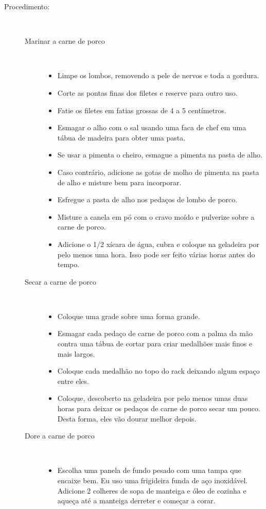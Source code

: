\documentclass [11pt, papel de carta] {article}
\begin{document}
\begin {description}
\item [Procedimento:] \ \\
        \begin {description}
        \item [Marinar a carne de porco] \ \\
                \begin {itemize}
\item Limpe os lombos, removendo a pele de nervos e toda a gordura.
\item Corte as pontas finas dos filetes e reserve para outro uso.
\item Fatie os filetes em fatias grossas de 4 a 5 centímetros.
\item Esmagar o alho com o sal usando uma faca de chef em uma tábua de madeira para obter uma pasta.
\item Se usar a pimenta o cheiro, esmague a pimenta na pasta de alho.
\item Caso contrário, adicione as gotas de molho de pimenta na pasta de alho e misture bem para incorporar.
\item Esfregue a pasta de alho nos pedaços de lombo de porco.
\item Misture a canela em pó com o cravo moído e pulverize sobre a carne de porco.
\item Adicione o 1/2 xícara de água, cubra e coloque na geladeira por pelo menos uma hora. Isso pode ser feito várias horas antes do tempo.
\end {itemize}
\item [Secar a carne de porco] \ \\
\begin {itemize}
\item Coloque uma grade sobre uma forma grande.
\item Esmagar cada pedaço de carne de porco com a palma da mão contra uma tábua de cortar para criar medalhões mais finos e mais largos.
\item Coloque cada medalhão no topo do rack deixando algum espaço entre eles.
\item Coloque, descoberto na geladeira por pelo menos umas duas horas para deixar os pedaços de carne de porco secar um pouco. Desta forma, eles vão dourar melhor depois.
\end {itemize}
\item [Dore a carne de porco] \ \\
\begin {itemize}
\item Escolha uma panela de fundo pesado com uma tampa que encaixe bem. Eu uso uma frigideira funda de aço inoxidável. Adicione 2 colheres de sopa de manteiga e óleo de cozinha e aqueça até a manteiga derreter e começar a corar.

\end{itemize}
\end{description}
\end{description}
\end{document}
